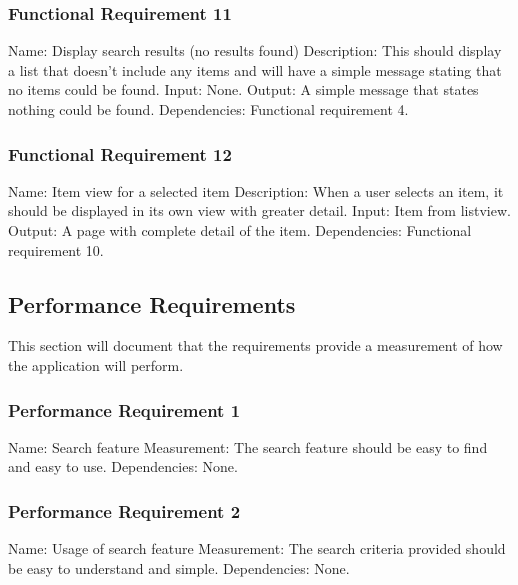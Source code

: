 \documentclass[journal,compsoc, 10pt, draftclsnofoot, onecolumn]{IEEEtran}
\begin{document}
\subsubsection{Functional Requirement 11}
Name: Display search results (no results found)\newline
Description: This should display a list that doesn't include any items and will 
have a simple message stating that no items could be found. \newline
Input: None.\newline
Output: A simple message that states nothing could be found.\newline
Dependencies: Functional requirement 4.

\subsubsection{Functional Requirement 12}
Name: Item view for a selected item\newline
Description: When a user selects an item, it should be displayed in its own view
 with greater detail.\newline
Input: Item from listview.\newline
Output: A page with complete detail of the item.\newline
Dependencies: Functional requirement 10.

\subsection{Performance Requirements}

This section will document that the requirements provide a measurement of how 
the application will perform.

\subsubsection{Performance Requirement 1}
Name: Search feature\newline
Measurement: The search feature should be easy to find and easy to use.\newline
Dependencies: None.

\subsubsection{Performance Requirement 2}
Name: Usage of search feature\newline
Measurement: The search criteria provided should be easy to understand and 
simple.\newline
Dependencies: None.
\end{document}
